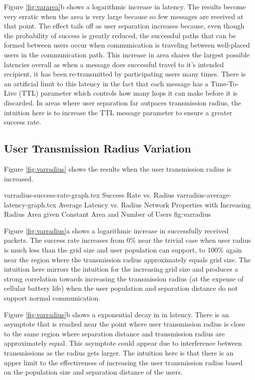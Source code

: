 Figure \ref{fig:vararea}b shows a logarithmic increase in latency.
The results become very erratic when the area is very large because so few messages
are received at that point.
The effect tails off as user separation increases because, even though the probability
of success is greatly reduced, the successful paths that can be formed between users
occur when communication is traveling between well-placed users in the communication path.
This increase in area shares the largest possible latencies overall as when a message does
successful travel to it's intended recipient, it has been re-transmitted by participating
users many times.
There is an artificial limit to this latency in the fact that each message has a Time-To-Live (TTL)
parameter which controls how many hops it can make before it is discarded.
In areas where user separation far outpaces transmission radius, the intuition here is to
increase the TTL message parameter to ensure a greater success rate.

\subsection{User Transmission Radius Variation}
Figure \ref{fig:varradius} shows the results when the user transmission radius is increased.

\sidebysidefigures
{varradius-success-rate-graph.tex}     {Success Rate vs. Radius}
{varradius-average-latency-graph.tex}  {Average Latency vs. Radius}
{Network Properties with Increasing Radius Area given Constant Area and Number of Users}
{fig:varradius}

Figure \ref{fig:varradius}a shows a logarithmic increase in successfully received packets.
The success rate increases from 0\% near the trivial case when user radius is much less
than the grid size and user population can support, to 100\% again near the region where
the transmission radius approximately equals grid size.
The intuition here mirrors the intuition for the increasing grid size and produces a strong
correlation towards increasing the transmission radius (at the expense of cellular battery life)
when the user population and separation distance do not support normal communication.

Figure \ref{fig:varradius}b shows a exponential decay in in latency.
There is an asymptote that is reached near the point where user transmission radius is
close to the same region where separation distance and transmission radius are approximately
equal. This asymptote could appear due to interference between transmissions as the radius 
gets larger. The intuition here is that there is an upper limit to the effectiveness of increasing
the user transmission radius based on the population size and separation distance of the users.

